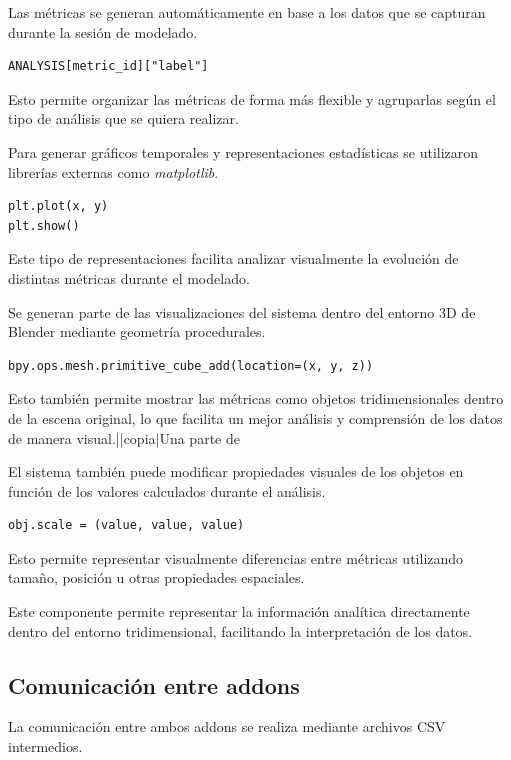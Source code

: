 Las métricas se generan automáticamente en base a los datos que se capturan durante la sesión de modelado.

\begin{verbatim}
ANALYSIS[metric_id]["label"]
\end{verbatim}

Esto permite organizar las métricas de forma más flexible y agruparlas según el tipo de análisis que se quiera realizar.

Para generar gráficos temporales y representaciones estadísticas se utilizaron librerías externas como \textit{matplotlib}.

\begin{verbatim}
plt.plot(x, y)
plt.show()
\end{verbatim}

Este tipo de representaciones facilita analizar visualmente la evolución de distintas métricas durante el modelado.

Se generan parte de las visualizaciones del sistema dentro del entorno 3D de Blender mediante geometría procedurales.

\begin{verbatim}
bpy.ops.mesh.primitive_cube_add(location=(x, y, z))
\end{verbatim}

Esto también permite mostrar las métricas como objetos tridimensionales dentro de la escena original, lo que facilita un mejor análisis y comprensión de los datos de manera visual.||copia|Una parte de

El sistema también puede modificar propiedades visuales de los objetos en función de los valores calculados durante el análisis.

\begin{verbatim}
obj.scale = (value, value, value)
\end{verbatim}

Esto permite representar visualmente diferencias entre métricas utilizando tamaño, posición u otras propiedades espaciales.

Este componente permite representar la información analítica directamente dentro del entorno tridimensional, facilitando la interpretación de los datos.

\subsection{Comunicación entre addons}

La comunicación entre ambos addons se realiza mediante archivos CSV intermedios.

